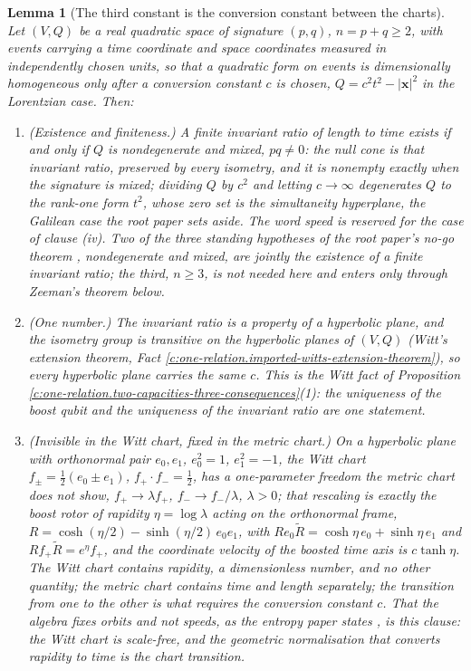 \documentclass[11pt]{article}
\newtheorem{lemma}[theorem]{Lemma}
\theoremstyle{definition}
\theoremstyle{plain}
\newcommand{\changedmark}[2]{\marginpar{\raggedright\scriptsize\color{#1}#2}}
\begin{document}
\begin{lemma}[The third constant is the conversion constant between the charts]\label{c:one-relation.third-constant-conversion-constant-between-charts}
\changedmark{gray}{reworded}
Let $(V, Q)$ be a real quadratic space of signature $(p, q)$, $n = p + q \geq 2$, with events carrying a time coordinate and space coordinates measured in independently chosen units, so that a quadratic form on events is dimensionally homogeneous only after a conversion constant $c$ is chosen, $Q = c^{2}t^{2} - |\mathbf{x}|^{2}$ in the Lorentzian case. Then:
\begin{enumerate}
\item[(i)] \emph{(Existence and finiteness.)} A finite invariant ratio of length to time exists if and only if $Q$ is nondegenerate and mixed, $pq \neq 0$: the null cone is that invariant ratio, preserved by every isometry, and it is nonempty exactly when the signature is mixed; dividing $Q$ by $c^{2}$ and letting $c \to \infty$ degenerates $Q$ to the rank-one form $t^{2}$, whose zero set is the simultaneity hyperplane, the Galilean case the root paper sets aside. The word \emph{speed} is reserved for the case of clause (iv). Two of the three standing hypotheses of the root paper's no-go theorem \cite[Thm.~4.2]{ButlerT1}, nondegenerate and mixed, are jointly the existence of a finite invariant ratio; the third, $n \geq 3$, is not needed here and enters only through Zeeman's theorem below.
\item[(ii)] \emph{(One number.)} The invariant ratio is a property of a hyperbolic plane, and the isometry group is transitive on the hyperbolic planes of $(V, Q)$ (Witt's extension theorem, Fact \ref{c:one-relation.imported-witts-extension-theorem}), so every hyperbolic plane carries the same $c$. This is the Witt fact of Proposition \ref{c:one-relation.two-capacities-three-consequences}(1): the uniqueness of the boost qubit and the uniqueness of the invariant ratio are one statement.
\item[(iii)] \emph{(Invisible in the Witt chart, fixed in the metric chart.)} On a hyperbolic plane with orthonormal pair $e_{0}, e_{1}$, $e_{0}^{2} = 1$, $e_{1}^{2} = -1$, the Witt chart $f_{\pm} = \tfrac12(e_{0} \pm e_{1})$, $f_{+} \cdot f_{-} = \tfrac12$, has a one-parameter freedom the metric chart does not show, $f_{+} \to \lambda f_{+}$, $f_{-} \to f_{-}/\lambda$, $\lambda > 0$; that rescaling is exactly the boost rotor of rapidity $\eta = \log\lambda$ acting on the orthonormal frame, $R = \cosh(\eta/2) - \sinh(\eta/2)\,e_{0}e_{1}$, with $R e_{0}\tilde{R} = \cosh\eta\, e_{0} + \sinh\eta\, e_{1}$ and $R f_{+}\tilde{R} = e^{\eta}f_{+}$, and the coordinate velocity of the boosted time axis is $c\tanh\eta$. The Witt chart contains rapidity, a dimensionless number, and no other quantity; the metric chart contains time and length separately; the transition from one to the other is what requires the conversion constant $c$. That the algebra fixes orbits and not speeds, as the entropy paper states \cite[Fact~2.2]{ButlerT8}, is this clause: the Witt chart is scale-free, and the geometric normalisation that converts rapidity to time is the chart transition.

\end{enumerate}
\end{lemma}
\end{document}
